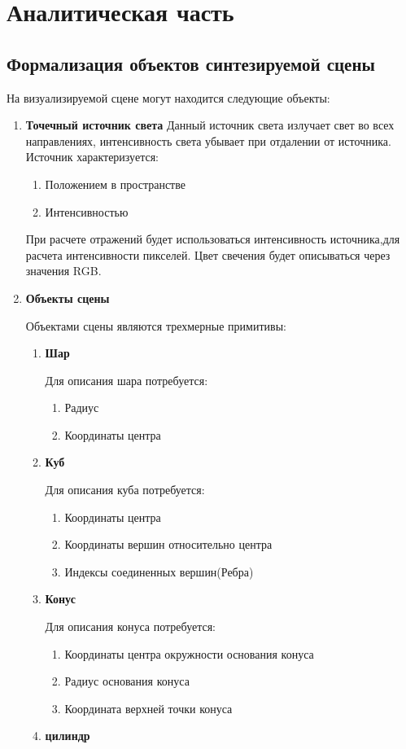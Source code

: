 \chapter{Аналитическая часть}
\section[Формализация объектов синтезируемой сцены]{Формализация объектов синтезируемой сцены}
\label{sec:obj_formalasation}
На визуализируемой сцене могут находится следующие объекты:
\begin{enumerate}
	\item \textbf{Точечный источник света}
	Данный источник света излучает свет во всех направлениях, интенсивность света убывает при отдалении от источника.
	Источник характеризуется:
	\begin{enumerate}
		\item Положением в пространстве
		\item Интенсивностью
	\end{enumerate}
	При расчете отражений будет использоваться интенсивность источника,для расчета интенсивности пикселей. Цвет свечения будет описываться через значения RGB.
	\item \textbf{Объекты сцены}
	
	Объектами сцены являются трехмерные примитивы:
	\begin{enumerate}
		\item \textbf{Шар}
		
		Для описания шара потребуется:
		\begin{enumerate}
			\item Радиус
			\item Координаты центра
		\end{enumerate}
		\item  \textbf{Куб}
		
		Для описания куба потребуется:
		\begin{enumerate}
			\item Координаты центра
			\item Координаты вершин относительно центра
			\item Индексы соединенных вершин(Ребра)
		\end{enumerate}
		\item  \textbf{Конус}
		
		Для описания конуса потребуется:
		\begin{enumerate}
			\item Координаты центра окружности основания конуса
			\item Радиус основания конуса
			\item Координата верхней точки конуса
		\end{enumerate}
		\item  \textbf{цилиндр}
		

\end{enumerate}
\end{enumerate}
